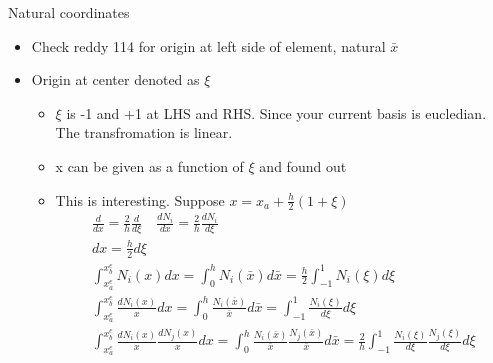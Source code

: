 	\begin{frame}{Natural coordinates}
		\begin{itemize}
			\item Check reddy 114 for origin at left side of element, natural $\bar{x}$
			\item Origin at center denoted as $\xi$
				\begin{itemize}
					\item $\xi$ is -1 and +1 at LHS and RHS. Since your current basis is eucledian. The transfromation is linear.
					\item x can be given as a function of $\xi$ and found out
					\item This is interesting. Suppose $x = x_a +\frac{h}{2}(1+\xi)$
					\begin{equation}
					\begin{aligned}
						\frac{d }{d x}  = \frac{2}{h}\frac{d }{d \xi} \quad \frac{d N_i}{d x}  = \frac{2}{h}\frac{d N_i}{d \xi} \\
						dx = \frac{h}{2} d\xi \\ 
						\int_{x_a^e}^{x_b^e}  N_i(x) dx = \int_{0}^{h}  N_i(\bar{x}) d\bar{x} = \frac{h}{2} \int_{-1}^{1} N_i(\xi) d\xi \\ 
						\int_{x_a^e}^{x_b^e}  \frac{dN_i(x)}{x} dx = \int_{0}^{h}  \frac{N_i(\bar{x})}{\bar{x}} d\bar{x} =  \int_{-1}^{1} \frac{N_i(\xi)}{d\xi} d\xi \\ 
						\int_{x_a^e}^{x_b^e}  \frac{dN_i(x)}{x} \frac{dN_j(x)}{x} dx = \int_{0}^{h}  \frac{N_i(\bar{x})}{\bar{x}}  \frac{N_j(\bar{x})}{\bar{x}} d\bar{x} = \frac{2}{h} \int_{-1}^{1} \frac{N_i(\xi)}{d\xi} \frac{N_j(\xi)}{d\xi}d\xi 
					\end{aligned}
					\end{equation}	
				\end{itemize}
			
		\end{itemize}
	\end{frame}



